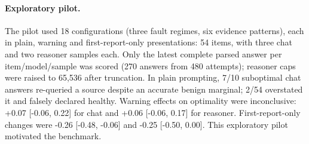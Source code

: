 \paragraph{Exploratory pilot.}
The pilot used 18 configurations (three fault regimes, six evidence patterns), each in plain, warning and first-report-only presentations: 54 items, with three chat and two reasoner samples each. Only the latest complete parsed answer per item/model/sample was scored (270 answers from 480 attempts); reasoner caps were raised to 65,536 after truncation. In plain prompting, 7/10 suboptimal chat answers re-queried a source despite an accurate benign marginal; 2/54 overstated it and falsely declared healthy. Warning effects on optimality were inconclusive: +0.07 [-0.06, 0.22] for chat and +0.06 [-0.06, 0.17] for reasoner. First-report-only changes were -0.26 [-0.48, -0.06] and -0.25 [-0.50, 0.00]. This exploratory pilot motivated the benchmark.

